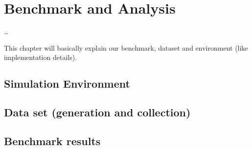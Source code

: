 \chapter{Benchmark and Analysis}  \label{chap:bench_analysis}

\ifpdf
    \graphicspath{{7/figures/PNG/}{7/figures/PDF/}{7/figures/}}
\else
    \graphicspath{{7/figures/EPS/}{7/figures/}}
\fi

\dots

This chapter will basically explain our benchmark, dataset and environment (like implementation details).

\section{Simulation Environment}

\section{Data set (generation and collection)} \label{chap_b&a:sec:data_set}

\section{Benchmark results} \label{chap_b&a:sec:results}